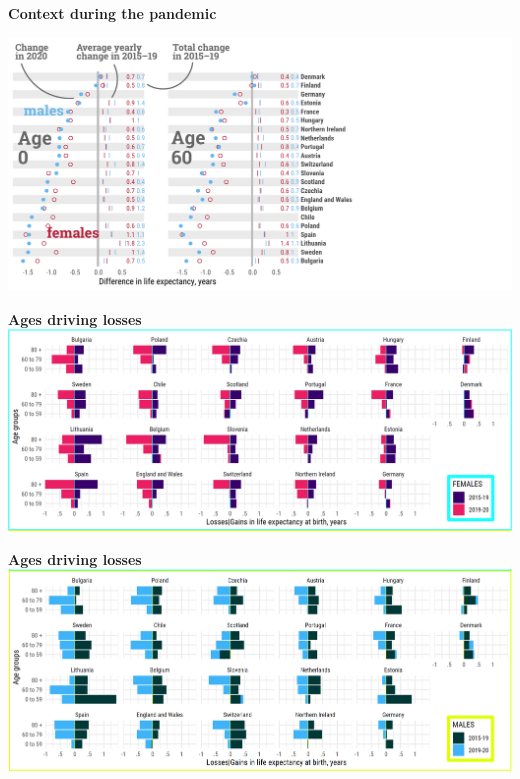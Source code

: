 \documentclass[xcolor={dvipsnames}]{beamer}
\begin{document}
\begin{frame}
\Large{
	\begin{center}
		\textbf{Context during the pandemic}
	\end{center} 
	\includegraphics[scale=.72]{fig-2-ann}	
}
\end{frame}

\begin{frame}
\Large{
	\begin{center}
		\textbf{Ages driving losses}
		\hspace*{-1cm}   
		\includegraphics[scale=.34]{decomp_females}	
	\end{center} 
}
\end{frame}

\begin{frame}
\Large{
	\begin{center}
		\textbf{Ages driving losses}
		\hspace*{-1cm}   
		\includegraphics[scale=.34]{decomp_males}	
	\end{center} 
}
\end{frame}
\end{document}
